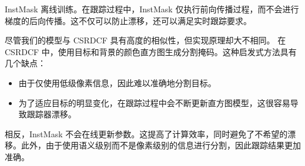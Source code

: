 InstMask 离线训练。在跟踪过程中，InstMask 仅执行前向传播过程，而不会进行梯度的后向传播。这不仅可以防止漂移，还可以满足实时跟踪要求。

尽管我们的模型与 CSRDCF \cite{Lukezic2017DiscriminativeCF}具有高度的相似性，但实现原理却大不相同。
在CSRDCF \cite{Lukezic2017DiscriminativeCF}中，使用目标和背景的颜色直方图生成分割掩码。这种启发式方法具有几个缺点：

\begin{itemize}
\item 由于仅使用低级像素信息，因此难以准确地分割目标。
\item 为了适应目标的明显变化，在跟踪过程中会不断更新直方图模型，这很容易导致跟踪器漂移。
\end{itemize}

相反，InstMask 不会在线更新参数。这提高了计算效率，同时避免了不希望的漂移。此外，由于使用语义级别而不是像素级别的信息进行分割，因此跟踪结果更加准确。

